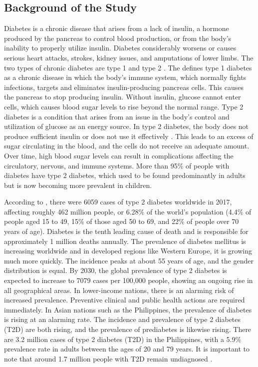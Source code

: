 \subsection*{Background of the Study}
Diabetes is a chronic disease that arises from a lack of insulin, a hormone
produced by the pancreas to control blood production, or from the body's
inability to properly utilize insulin. Diabetes considerably worsens or causes
serious heart attacks, strokes, kidney issues, and amputations of lower limbs.
The two types of chronic diabetes are type 1 and type 2
\parencite{who-2023-diabetes}. The \textcite{niddk-2023} defines type 1 diabetes
as a chronic disease in which the body's immune system, which normally fights
infections, targets and eliminates insulin-producing pancreas cells. This causes
the pancreas to stop producing insulin. Without insulin, glucose cannot enter
cells, which causes blood sugar levels to rise beyond the normal range. Type 2
diabetes is a condition that arises from an issue in the body's control and
utilization of glucose as an energy source. In type 2 diabetes, the body does
not produce sufficient insulin or does not use it effectively
\parencite{chundawat-2022}. This leads to an excess of sugar circulating in the
blood, and the cells do not receive an adequate amount. Over time, high blood
sugar levels can result in complications affecting the circulatory, nervous, and
immune systems. More than 95\% of people with diabetes have type 2 diabetes,
which used to be found predominantly in adults but is now becoming more
prevalent in children.

According to \textcite{khan-2019}, there were 6059 cases of type 2 diabetes
worldwide in 2017, affecting roughly 462 million people, or 6.28\% of the world's
population (4.4\% of people aged 15 to 49, 15\% of those aged 50 to 69, and 22\% of
people over 70 years of age). Diabetes is the tenth leading cause of death and
is responsible for approximately 1 million deaths annually. The prevalence of
diabetes mellitus is increasing worldwide and in developed regions like Western
Europe, it is growing much more quickly. The incidence peaks at about 55 years
of age, and the gender distribution is equal. By 2030, the global prevalence of
type 2 diabetes is expected to increase to 7079 cases per 100,000 people,
showing an ongoing rise in all geographical areas. In lower-income nations,
there is an alarming risk of increased prevalence. Preventive clinical and
public health actions are required immediately. In Asian nations such as the
Philippines, the prevalence of diabetes is rising at an alarming rate. The
incidence and prevalence of type 2 diabetes (T2D) are both rising, and the
prevalence of prediabetes is likewise rising. There are 3.2 million cases of
type 2 diabetes (T2D) in the Philippines, with a 5.9\% prevalence rate in adults
between the ages of 20 and 79 years. It is important to note that around 1.7
million people with T2D remain undiagnosed \parencite{tan-2016}.

